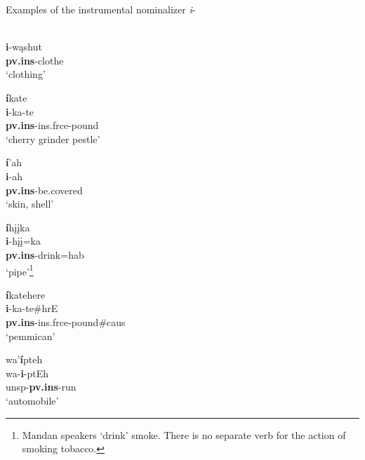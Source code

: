\begin{exe}

\item\label{INSnominals} Examples of the instrumental nominalizer \textit{i}-

    \begin{xlist}
    
    \item\label{INSnominals1} \\
        \textbf{i}-wąshut\\
        \textbf{pv.ins}-\textnormal{clothe}\\
        \glt `clothing'
    
    \item\label{INSnominals2} \glll \textbf{í}kate\\
    \textbf{i}-ka-te\\
    \textbf{pv.ins}-ins.frce-\textnormal{pound}\\
    \glt `cherry grinder pestle'
    
    
    \item\label{INSnominals3} \glll \textbf{í}'ah\\
        \textbf{i}-ah\\
        \textbf{pv.ins}-\textnormal{be.covered}\\
        \glt `skin, shell'
    
    \item\label{INSnominals4} \glll \textbf{í}hįįka\\
    \textbf{i}-hįį=ka\\
    \textbf{pv.ins}-\textnormal{drink}=hab\\
    \glt `pipe'\footnote{Mandan speakers `drink' smoke. There is no separate verb for the action of smoking tobacco.}
    
    \item\label{INSnominals5} \glll \textbf{í}katehere\\
    \textbf{i}-ka-te\#hrE\\
    \textbf{pv.ins}-ins.frce-\textnormal{pound}\#caus\\
    \glt `pemmican'
    
    \item\label{INSnominals6} \glll wa'\textbf{í}pteh\\
    wa-\textbf{i}-ptEh\\
    unsp-\textbf{pv.ins}-\textnormal{run}\\
    \glt `automobile'
    
    \end{xlist}

\end{exe}


